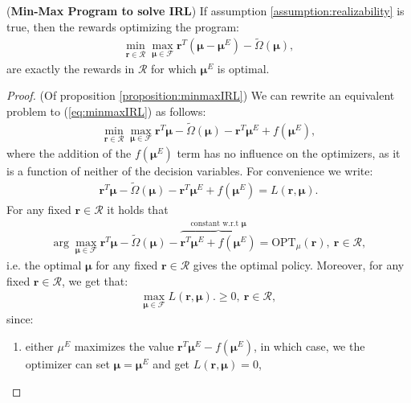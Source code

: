\begin{proposition}
    \label{proposition:minmaxIRL}
    (\textbf{Min-Max Program to solve IRL})
    If assumption \ref{assumption:realizability} is true, then the rewards optimizing the program:
    \begin{equation}
        \label{eq:minmaxIRL}
        \begin{aligned}
            \min_{\bm{r}\in\mathcal{R}}\max_{\bm{\mu}\in\mathcal{F}} \bm{r}^T(\bm{\mu}-\bm{\mu}^E)-\tilde{\Omega}(\bm{\mu}),
        \end{aligned}
    \end{equation}
    are exactly the rewards in $\mathcal{R}$ for which $\bm{\mu}^E$ is optimal.
\end{proposition}
\begin{proof}
    (Of proposition \ref{proposition:minmaxIRL}) We can rewrite an equivalent problem to (\ref{eq:minmaxIRL}) as follows:
    \begin{align*}
        \min_{\bm{r}\in\mathcal{R}}\max_{\bm{\mu}\in\mathcal{F}} \bm{r}^T\bm{\mu}-\tilde{\Omega}(\bm{\mu}) - \bm{r}^T \bm{\mu}^E + f(\bm{\mu}^E),
    \end{align*}
    where the addition of the $f(\bm{\mu}^E)$ term has no influence on the optimizers, as it is a function of neither of the decision variables. For convenience we write:
    \begin{align*}
        \bm{r}^T\bm{\mu}-\tilde{\Omega}(\bm{\mu}) - \bm{r}^T \bm{\mu}^E + f(\bm{\mu}^E) = L(\bm{r},\bm{\mu}).
    \end{align*}
    For any fixed $\bm{r}\in\mathcal{R}$ it holds that 
    \begin{align*}
        \arg\max_{\bm{\mu}\in\mathcal{F}} \bm{r}^T\bm{\mu}-\tilde{\Omega}(\bm{\mu}) - \overbrace{\bm{r}^T \bm{\mu}^E + f(\bm{\mu}^E)}^\text{constant w.r.t $\bm{\mu}$} = \text{OPT}_\mu(\bm{r}), ~\bm{r}\in \mathcal{R},
    \end{align*}
    i.e. the optimal $\bm{\mu}$ for any fixed $\bm{r} \in \mathcal{R}$ gives the optimal policy. Moreover, for any fixed $\bm{r} \in \mathcal{R}$, we get that:
    \begin{align*}
        \max_{\bm{\mu}\in\mathcal{F}} L(\bm{r},\bm{\mu}).\geq 0, ~\bm{r}\in \mathcal{R},
    \end{align*}
    since:
    \begin{enumerate}
        \item either $\mu^E$ maximizes the value $\bm{r}^T \bm{\mu}^E - f(\bm{\mu}^E)$, in which case, we the optimizer can set $\bm{\mu} = \bm{\mu}^E$ and get $ L(\bm{r},\bm{\mu})=0$,

\end{enumerate}
\end{proof}
